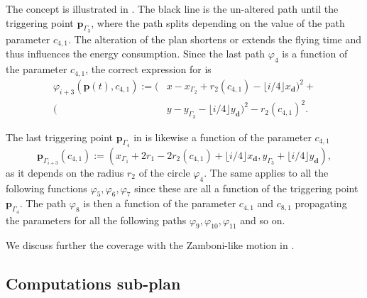 The concept is illustrated in . The black line is the un-altered path until the triggering point $\mathbf{p}_{\Gamma_3}$, where the path splits depending on the value of the path parameter $c_{4,1}$. The alteration of the plan shortens or extends the flying time and thus influences the energy consumption. Since the last path $\varphi_4$ is a function of the parameter $c_{4,1}$, the correct expression for  is 
\begin{equation}\label{eq:line-gene-param}\begin{split}
  \varphi_{i+3}(\mathbf{p}(t),c_{4,1}):=(&x-x_{\Gamma_2}+r_2(c_{4,1})-\lfloor i/4\rfloor x_\mathbf{d})^2+\\
  (&y-y_{\Gamma_3}-\lfloor i/4\rfloor y_\mathbf{d})^2-r_2(c_{4,1})^2.
\end{split}\end{equation}

The last triggering point $\mathbf{p}_{\Gamma_4}$ in  is likewise a function of the parameter $c_{4,1}$
\begin{equation}
  \mathbf{p}_{\Gamma_{i+3}}(c_{4,1}):=(x_{\Gamma_1}+2r_1-2r_2(c_{4,1})+\lfloor i/4\rfloor x_\mathbf{d},y_{\Gamma_3}+\lfloor i/4\rfloor y_\mathbf{d}),
\end{equation}
as it depends on the radius $r_2$ of the circle $\varphi_4$. The same applies to all the following functions $\varphi_5,\varphi_6,\varphi_7$ since these are all a function of the triggering point $\mathbf{p}_{\Gamma_4}$. The path $\varphi_8$ is then a function of the parameter $c_{4,1}$ and $c_{8,1}$ propagating the parameters for all the following paths $\varphi_9,\varphi_{10},\varphi_{11}$ and so on.

We discuss further the coverage with the Zamboni-like motion in .

\subsection{Computations sub-plan}
\label{sec:computation-wise}


